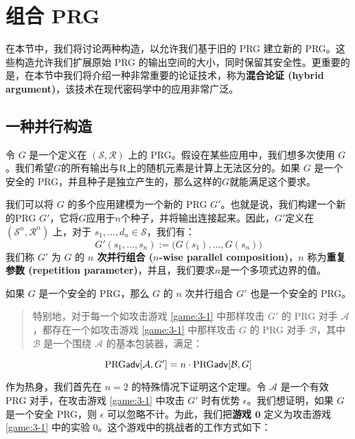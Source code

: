 \section{组合 PRG}

在本节中，我们将讨论两种构造，以允许我们基于旧的 PRG 建立新的 PRG。这些构造允许我们扩展原始 PRG 的输出空间的大小，同时保留其安全性。更重要的是，在本节中我们将介绍一种非常重要的论证技术，称为\textbf{混合论证 (hybrid argument)}，该技术在现代密码学中的应用非常广泛。

\subsection{一种并行构造}\label{subsec:3-4-1}

令 $G$ 是一个定义在 $(\mathcal S,\mathcal R)$ 上的 PRG。假设在某些应用中，我们想多次使用 $G$。我们希望$G$的所有输出与$\mathcal{\rm R}$上的随机元素是计算上无法区分的。如果 $G$ 是一个安全的 PRG，并且种子是独立产生的，那么这样的$G$就能满足这个要求。

我们可以将 $G$ 的多个应用建模为一个新的 PRG $G'$。也就是说，我们构建一个新的PRG $G'$，它将$G$应用于$n$个种子，并将输出连接起来。因此，$G'$定义在 $(\mathcal S^n,\mathcal R^n)$ 上，对于 $s_1,\dots,d_n\in\mathcal S$，我们有：
$$
G'(s_1,\dots,s_n):=\big(G(s_1),\dots,G(s_n)\big)
$$
我们称 $G'$ 为 $G$ 的 \textbf{$n$ 次并行组合 ($n$-wise parallel composition)}，$n$ 称为\textbf{重复参数 (repetition parameter)}，并且，我们要求$n$是一个多项式边界的值。

\begin{theorem}\label{theo:3-2}
如果 $G$ 是一个安全的 PRG，那么 $G$ 的 $n$ 次并行组合 $G'$ 也是一个安全的 PRG。
\begin{quote}
特别地，对于每一个如攻击游戏 \ref{game:3-1} 中那样攻击 $G'$ 的 PRG 对手 $\mathcal A$，都存在一个如攻击游戏 \ref{game:3-1} 中那样攻击 $G$ 的 PRG 对手 $\mathcal B$，其中 $\mathcal B$ 是一个围绕 $\mathcal A$ 的基本包装器，满足：
\end{quote}
$$
{\rm PRG\mathsf{adv}}[\mathcal{A},G']=n\cdot{\rm PRG\mathsf{adv}}[\mathcal{B},G]
$$
\end{theorem}

作为热身，我们首先在 $n=2$ 的特殊情况下证明这个定理。令 $\mathcal A$ 是一个有效 PRG 对手，在攻击游戏 \ref{game:3-1} 中攻击 $G'$ 时有优势 $\epsilon$。我们想证明，如果 $G$ 是一个安全 PRG，则 $\epsilon$ 可以忽略不计。为此，我们把\textbf{游戏 $\mathbf{0}$} 定义为攻击游戏 \ref{game:3-1} 中的实验 $0$。这个游戏中的挑战者的工作方式如下：

\vspace*{5pt}


